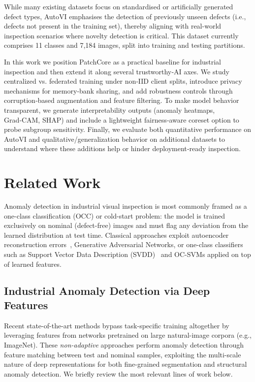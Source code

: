 \documentclass{article}
\begin{document}
While many existing datasets focus on standardised or artificially generated defect types, AutoVI emphasises the detection of previously unseen defects (i.e., defects not present in the training set), thereby aligning with real-world inspection scenarios where novelty detection is critical. This dataset currently comprises 11 classes and 7,184 images, split into training and testing partitions.  \citep{Carvalho2024AutoVI}

In this work we position PatchCore as a practical baseline for industrial inspection and then extend it along several trustworthy‑AI axes. We study centralized vs. federated training under non‑IID client splits, introduce privacy mechanisms for memory‑bank sharing, and add robustness controls through corruption‑based augmentation and feature filtering. To make model behavior transparent, we generate interpretability outputs (anomaly heatmaps, Grad‑CAM, SHAP) and include a lightweight fairness‑aware coreset option to probe subgroup sensitivity. Finally, we evaluate both quantitative performance on AutoVI and qualitative/generalization behavior on additional datasets to understand where these additions help or hinder deployment‑ready inspection.

\section{Related Work}

Anomaly detection in industrial visual inspection is most commonly
framed as a one-class classification (OCC) or cold-start problem: the
model is trained exclusively on nominal (defect-free) images and must
flag any deviation from the learned distribution at test time. Classical
approaches exploit autoencoder reconstruction errors~\cite{Sakurada2014},
Generative Adversarial Networks, or one-class classifiers such as
Support Vector Data Description (SVDD)~\cite{Tax2004} and OC-SVMs
applied on top of learned features.

\subsection{Industrial Anomaly Detection via Deep Features}

Recent state-of-the-art methods bypass task-specific training altogether
by leveraging features from networks pretrained on large natural-image
corpora (e.g., ImageNet). These \emph{non-adaptive} approaches perform
anomaly detection through feature matching between test and nominal
samples, exploiting the multi-scale nature of deep representations for
both fine-grained segmentation and structural anomaly detection. We
briefly review the most relevant lines of work below.
\end{document}
